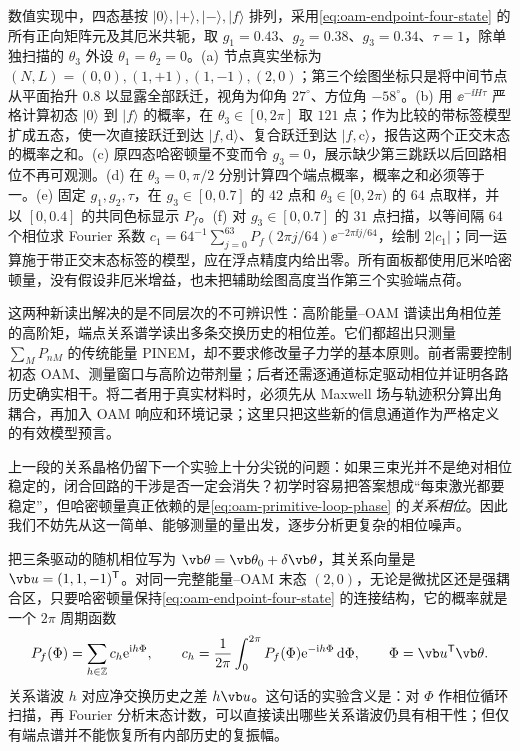 数值实现中，四态基按 $|0\rangle,|+\rangle,|-\rangle,|f\rangle$ 排列，采用\cref{eq:oam-endpoint-four-state} 的所有正向矩阵元及其厄米共轭，取 $g_1=0.43$、$g_2=0.38$、$g_3=0.34$、$\tau=1$，除单独扫描的 $\theta_3$ 外设 $\theta_1=\theta_2=0$。(a) 节点真实坐标为 $(N,L)=(0,0),(1,+1),(1,-1),(2,0)$；第三个绘图坐标只是将中间节点从平面抬升 $0.8$ 以显露全部跃迁，视角为仰角 $27^\circ$、方位角 $-58^\circ$。(b) 用 $\ee^{-\ii H\tau}$ 严格计算初态 $|0\rangle$ 到 $|f\rangle$ 的概率，在 $\theta_3\in[0,2\pi]$ 取 $121$ 点；作为比较的带标签模型扩成五态，使一次直接跃迁到达 $|f,\mathrm d\rangle$、复合跃迁到达 $|f,\mathrm c\rangle$，报告这两个正交末态的概率之和。(c) 原四态哈密顿量不变而令 $g_3=0$，展示缺少第三跳跃以后回路相位不再可观测。(d) 在 $\theta_3=0,\pi/2$ 分别计算四个端点概率，概率之和必须等于一。(e) 固定 $g_1,g_2,\tau$，在 $g_3\in[0,0.7]$ 的 $42$ 点和 $\theta_3\in[0,2\pi)$ 的 $64$ 点取样，并以 $[0,0.4]$ 的共同色标显示 $P_f$。(f) 对 $g_3\in[0,0.7]$ 的 $31$ 点扫描，以等间隔 $64$ 个相位求 Fourier 系数 $c_1=64^{-1}\sum_{j=0}^{63}P_f(2\pi j/64)\ee^{-2\pi\ii j/64}$，绘制 $2|c_1|$；同一运算施于带正交末态标签的模型，应在浮点精度内给出零。所有面板都使用厄米哈密顿量，没有假设非厄米增益，也未把辅助绘图高度当作第三个实验端点荷。


这两种新读出解决的是不同层次的不可辨识性：高阶能量--OAM 谱读出角相位差的高阶矩，端点关系谱学读出多条交换历史的相位差。它们都超出只测量 $\sum_M P_{nM}$ 的传统能量 PINEM，却不要求修改量子力学的基本原则。前者需要控制初态 OAM、测量窗口与高阶边带剂量；后者还需逐通道标定驱动相位并证明各路历史确实相干。将二者用于真实材料时，必须先从 Maxwell 场与轨迹积分算出角耦合，再加入 OAM 响应和环境记录；这里只把这些新的信息通道作为严格定义的有效模型预言。


上一段的关系晶格仍留下一个实验上十分尖锐的问题：如果三束光并不是绝对相位稳定的，闭合回路的干涉是否一定会消失？初学时容易把答案想成“每束激光都要稳定”，但哈密顿量真正依赖的是\cref{eq:oam-primitive-loop-phase} 的\emph{关系相位}。因此我们不妨先从这一简单、能够测量的量出发，逐步分析更复杂的相位噪声。

把三条驱动的随机相位写为 $\vb\theta=\vb\theta_0+\delta\vb\theta$，其关系向量是 $\vb u=(1,1,-1)^{\mathsf T}$。对同一完整能量--OAM 末态 $(2,0)$，无论是微扰区还是强耦合区，只要哈密顿量保持\cref{eq:oam-endpoint-four-state} 的连接结构，它的概率就是一个 $2\pi$ 周期函数
\begin{equation}
 P_f(\Phi)=\sum_{h\in\mathbb Z}c_h\ee^{\ii h\Phi},\qquad
 c_h=\frac1{2\pi}\int_0^{2\pi}P_f(\Phi)\ee^{-\ii h\Phi}\,\dd\Phi,
 \qquad \Phi=\vb u^{\mathsf T}\vb\theta.
 \label{eq:oam-noise-relation-fourier}
\end{equation}
关系谐波 $h$ 对应净交换历史之差 $h\vb u$。这句话的实验含义是：对 $\Phi$ 作相位循环扫描，再 Fourier 分析末态计数，可以直接读出哪些关系谐波仍具有相干性；但仅有端点谱并不能恢复所有内部历史的复振幅。

